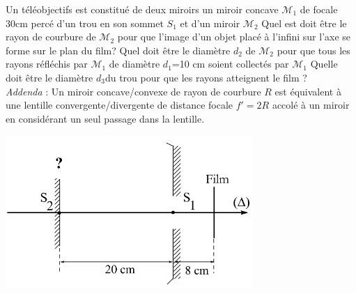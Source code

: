 \begin{Exercise}[title=Téleobjectif à deux miroirs]
Un téléobjectifs est constitué de deux miroirs un miroir concave $\mathcal{M}_1$ de focale 30cm percé d'un trou en son sommet $S_1$ et d'un miroir $\mathcal{M}_2$
\Question Quel est doit être le rayon de courbure de $\mathcal{M_2}$ pour que l'image d'un objet placé à l'infini sur l'axe se forme sur  le plan du film?
\Question Quel doit être le diamètre $d_2$ de $\mathcal{M}_2$ pour que tous les rayons réfléchis par $\mathcal{M}_1$ de diamètre $d_1$=10 cm soient collectés par $\mathcal{M}_1$
\Question Quelle doit être le diamètre $d_3$du trou pour que les rayons atteignent le film ? \\
\emph{Addenda} : Un miroir concave/convexe de rayon de courbure $R$ est équivalent à une lentille convergente/divergente de distance focale $f'= 2R$  accolé à un miroir en considérant un seul passage dans la lentille.
\begin{center}
	\includegraphics[scale=0.8]{./fig/teleob_vide.png}
\end{center}
\end{Exercise}
